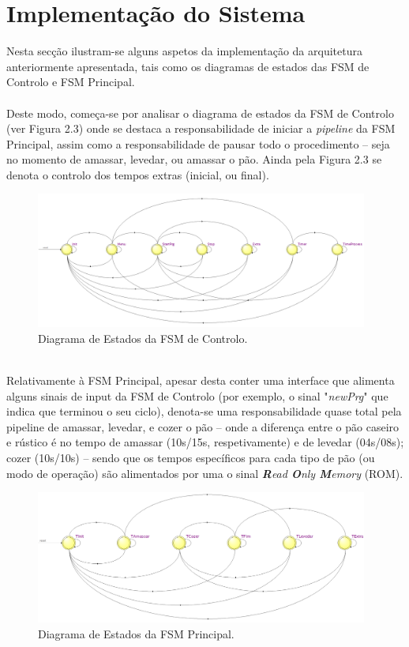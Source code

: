 \documentclass{report}
\begin{document}
\section{Implementação do Sistema}
Nesta secção ilustram-se alguns aspetos da implementação da arquitetura anteriormente apresentada, tais como os diagramas de estados das FSM de Controlo e FSM Principal.
\\\\
Deste modo, começa-se por analisar o diagrama de estados da FSM de Controlo (ver Figura 2.3) onde se destaca a responsabilidade de iniciar a \textit{pipeline} da FSM Principal, assim como a responsabilidade de pausar todo o procedimento -- seja no momento de amassar, levedar, ou amassar o pão. Ainda pela Figura 2.3 se denota o controlo dos tempos extras (inicial, ou final).
\begin{figure}[h!] %
	\center
	\includegraphics[width=310pt]{images/FSM1_2}
	\caption{Diagrama de Estados da FSM de Controlo.}
	\label{fig:imagem3}
\end{figure}
\\
Relativamente à FSM Principal, apesar desta conter uma interface que alimenta alguns sinais de input da FSM de Controlo (por exemplo, o sinal "\textit{newPrg}" que indica que terminou o seu ciclo), denota-se uma responsabilidade quase total pela pipeline de amassar, levedar, e cozer o pão -- onde a diferença entre o pão caseiro e rústico é no tempo de amassar (10s/15s, respetivamente) e de levedar (04s/08s); cozer (10s/10s) -- sendo que os tempos específicos para cada tipo de pão (ou modo de operação) são alimentados por uma o sinal \textit{\textbf{R}ead \textbf{O}nly \textbf{M}emory} (ROM).
\begin{figure}[h!] %
	\center
	\includegraphics[width=310pt]{images/FSM2_2}
	\caption{Diagrama de Estados da FSM Principal.}
	\label{fig:imagem4}
\end{figure}
\end{document}
